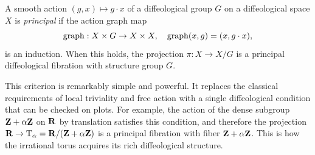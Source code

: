   \begin{article}
    A smooth action $(g,x) \mapsto g \cdot x$ of a diffeological group $G$ on a diffeological space $X$ is \emph{principal}
    if the action graph map
    \[
      \operatorname{graph}: X \times G \to X \times X, \quad \operatorname{graph}(x,g) = (x, g \cdot x),
      \]
    is an induction.
    When this holds,
    the projection $\pi: X \to X/G$ is a principal diffeological fibration with structure group $G$.
    
    This criterion is remarkably simple and powerful.
    It replaces the classical requirements of local triviality and free action
    with a single diffeological condition that can be checked on plots.
    For example,
    the action of the dense subgroup ${\mathbf{Z}} + \alpha{\mathbf{Z}}$ on ${\mathbf{R}}$ by translation
    satisfies this condition,
    and therefore the projection ${\mathbf{R}} \to \mathrm{T}_\alpha = {\mathbf{R}}/({\mathbf{Z}} + \alpha{\mathbf{Z}})$
    is a principal fibration with fiber ${\mathbf{Z}} + \alpha{\mathbf{Z}}$.
    This is how the irrational torus acquires its rich diffeological structure.
  \end{article}
  
